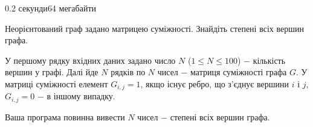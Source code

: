 \begin{problem}{}{}{}{0.2 секунди}{64 мегабайти}

Неорієнтований граф задано матрицею суміжності. Знайдіть степені всіх вершин графа.

\InputFile
У першому рядку вхідних даних задано число $N$ ($1 \le N \le 100$) $-$ кількість вершин у графі.
Далі йде $N$ рядків по $N$ чисел $-$ матриця суміжності графа $G$. У матриці суміжності елемент $G_{i,j}=1$, якщо
існує ребро, що з'єднує вершини $i$ і $j$, $G_{i,j}=0$ $-$ в іншому випадку.

\OutputFile
Ваша програма повинна вивести $N$ чисел $-$ степені всіх вершин графа.

\Example
\begin{example}
%
\end{example}

\end{problem}

